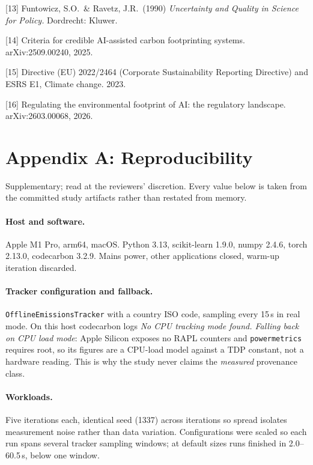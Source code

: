 \documentclass{article}
\begin{document}
[13] Funtowicz, S.O.\ \& Ravetz, J.R.\ (1990) {\it Uncertainty and Quality in
Science for Policy.} Dordrecht: Kluwer.

[14] Criteria for credible AI-assisted carbon footprinting systems.
arXiv:2509.00240, 2025.

[15] Directive (EU) 2022/2464 (Corporate Sustainability Reporting Directive)
and ESRS E1, Climate change. 2023.

[16] Regulating the environmental footprint of AI: the regulatory landscape.
arXiv:2603.00068, 2026.

\appendix
\section*{Appendix A: Reproducibility}

Supplementary; read at the reviewers' discretion. Every value below is taken
from the committed study artifacts rather than restated from memory.

\paragraph{Host and software.} Apple M1 Pro, arm64, macOS. Python 3.13,
scikit-learn 1.9.0, numpy 2.4.6, torch 2.13.0, codecarbon 3.2.9. Mains power,
other applications closed, warm-up iteration discarded.

\paragraph{Tracker configuration and fallback.} \texttt{OfflineEmissionsTracker}
with a country ISO code, sampling every 15\,s in real mode. On this host
codecarbon logs \emph{No CPU tracking mode found. Falling back on CPU load
mode}: Apple Silicon exposes no RAPL counters and \texttt{powermetrics}
requires root, so its figures are a CPU-load model against a TDP constant, not
a hardware reading. This is why the study never claims the \emph{measured}
provenance class.

\paragraph{Workloads.} Five iterations each, identical seed (1337) across
iterations so spread isolates measurement noise rather than data variation.
Configurations were scaled so each run spans several tracker sampling windows;
at default sizes runs finished in 2.0--60.5\,s, below one window.
\end{document}
